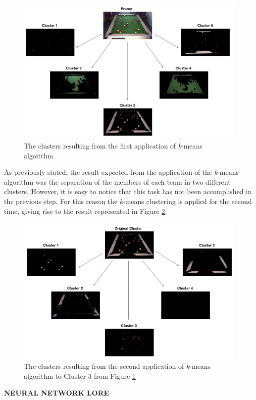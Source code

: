 \documentclass{usiinftr}
\begin{document}
\begin{figure}[h]
	\centering
	\includegraphics[width=0.8\linewidth]{./img/cluster1}
	\caption{The clusters resulting from the first application of \textit{k}-means algorithm}
	\label{fig:5}
\end{figure}
\noindent
As previously stated, the result expected from the application of the \textit{k}-means algorithm was the separation of the members of each team in two different clusters. However, it is easy to notice that this task has not been accomplished in the previous step. For this reason the \textit{k}-means clustering is applied for the second time, giving rise to the result represented in Figure \ref{fig:6}. 

\begin{figure}[h]
	\centering
	\includegraphics[width=0.8\linewidth]{./img/clusters2}
	\caption{The clusters resulting from the second application of \textit{k}-means algorithm to Cluster 3 from Figure \ref{fig:5}}
	\label{fig:6}
\end{figure}

\textbf{NEURAL NETWORK LORE}\\
\end{document}
